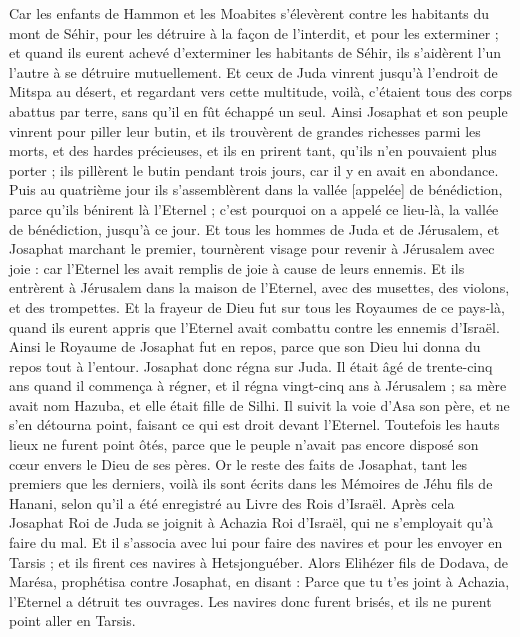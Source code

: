 \begin{multicols}{2}
Car les enfants de Hammon et les Moabites s'élevèrent contre les habitants du mont de Séhir, pour les détruire à la façon de l'interdit, et pour les exterminer ; et quand ils eurent achevé d'exterminer les habitants de Séhir, ils s'aidèrent l'un l'autre à se détruire mutuellement.
Et ceux de Juda vinrent jusqu'à l'endroit de Mitspa au désert, et regardant vers cette multitude, voilà, c'étaient tous des corps abattus par terre, sans qu'il en fût échappé un seul.
Ainsi Josaphat et son peuple vinrent pour piller leur butin, et ils trouvèrent de grandes richesses parmi les morts, et des hardes précieuses, et ils en prirent tant, qu'ils n'en pouvaient plus porter ; ils pillèrent le butin pendant trois jours, car il y en avait en abondance.
Puis au quatrième jour ils s'assemblèrent dans la vallée [appelée] de bénédiction, parce qu'ils bénirent là l'Eternel ; c'est pourquoi on a appelé ce lieu-là, la vallée de bénédiction, jusqu'à ce jour.
Et tous les hommes de Juda et de Jérusalem, et Josaphat marchant le premier, tournèrent visage pour revenir à Jérusalem avec joie : car l'Eternel les avait remplis de joie à cause de leurs ennemis.
Et ils entrèrent à Jérusalem dans la maison de l'Eternel, avec des musettes, des violons, et des trompettes.
Et la frayeur de Dieu fut sur tous les Royaumes de ce pays-là, quand ils eurent appris que l'Eternel avait combattu contre les ennemis d'Israël.
Ainsi le Royaume de Josaphat fut en repos, parce que son Dieu lui donna du repos tout à l'entour.
Josaphat donc régna sur Juda. Il était âgé de trente-cinq ans quand il commença à régner, et il régna vingt-cinq ans à Jérusalem ; sa mère avait nom Hazuba, et elle était fille de Silhi.
Il suivit la voie d'Asa son père, et ne s'en détourna point, faisant ce qui est droit devant l'Eternel.
Toutefois les hauts lieux ne furent point ôtés, parce que le peuple n'avait pas encore disposé son cœur envers le Dieu de ses pères.
Or le reste des faits de Josaphat, tant les premiers que les derniers, voilà ils sont écrits dans les Mémoires de Jéhu fils de Hanani, selon qu'il a été enregistré au Livre des Rois d'Israël.
Après cela Josaphat Roi de Juda se joignit à Achazia Roi d'Israël, qui ne s'employait qu'à faire du mal.
Et il s'associa avec lui pour faire des navires et pour les envoyer en Tarsis ; et ils firent ces navires à Hetsjonguéber.
Alors Elihézer fils de Dodava, de Marésa, prophétisa contre Josaphat, en disant : Parce que tu t'es joint à Achazia, l'Eternel a détruit tes ouvrages. Les navires donc furent brisés, et ils ne purent point aller en Tarsis.

\end{multicols}

